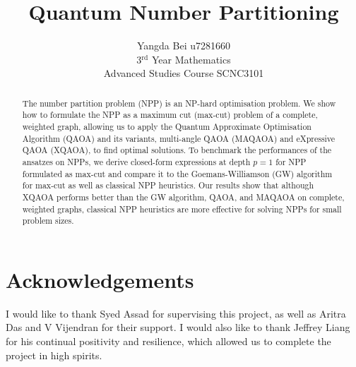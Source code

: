 \documentclass[aps,twocolumn,preprintnumbers]{revtex4}
\begin{document}
\title{Quantum Number Partitioning}
\author{Yangda Bei u7281660 \\ 3$^\text{rd}$ Year Mathematics \\ Advanced Studies Course SCNC3101}




    \begin{abstract}
    \centering

        The number partition problem (NPP) is an NP-hard optimisation problem. We show how to formulate the NPP as a maximum cut (max-cut) problem of a complete, weighted graph, allowing us to apply the Quantum Approximate Optimisation Algorithm (QAOA) and its variants, multi-angle QAOA (MAQAOA) and eXpressive QAOA (XQAOA), to find optimal solutions. To benchmark the performances of the ansatzes on NPPs, we derive closed-form expressions at depth $p=1$ for NPP formulated as max-cut and compare it to the Goemans-Williamson (GW) algorithm for max-cut as well as classical NPP heuristics. Our results show that although XQAOA performs better than the GW algorithm, QAOA, and MAQAOA on complete, weighted graphs, classical NPP heuristics are more effective for solving NPPs for small problem sizes.
    \end{abstract}

\maketitle 


    

    
    
    
    

    

    

    

    

    \section*{Acknowledgements}

    I would like to thank Syed Assad for supervising this project, as well as Aritra Das and V Vijendran for their support. I would also like to thank Jeffrey Liang for his continual positivity and resilience, which allowed us to complete the project in high spirits.

    
    
\end{document}
